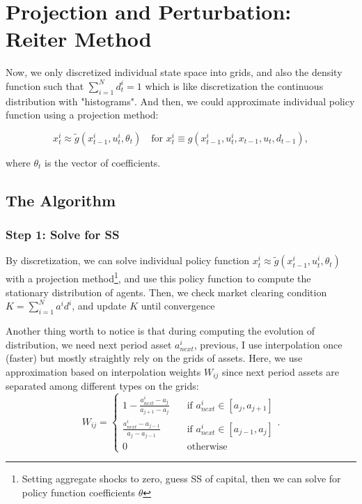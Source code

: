 \section{Projection and Perturbation: Reiter Method}

Now, we only {\color{red} discretized individual state space into grids}, and also the density function such that $\sum_{i=1}^{N} d^i_t = 1$ which is like discretization the continuous distribution with "histograms". And then, we could approximate individual policy function using a projection method:

\[ 
x^i_t \approx \tilde{g}(x^i_{t-1},u^i_t, \theta_t) \quad \text{for } x^i_t \equiv g(x^i_{t-1}, u^i_t, x_{t-1},u_t,d_{t-1}), 
\]

where $\theta_t$ is the vector of coefficients. 

\subsection{The Algorithm}

\subsubsection*{Step 1: Solve for SS}

By discretization, we can solve individual policy function $x^i_t \approx \tilde{g}(x^i_{t-1},u^i_t, \theta_t)$ with a projection method\footnote{Setting aggregate shocks to zero, guess SS of capital, then we can solve for policy function coefficients $\theta$}, and use this policy function to compute the stationary distribution of agents. Then, we check market clearing condition $K=\sum_{i=1}^{N} a^i d^i$, and update $K$ until convergence

Another thing worth to notice is that during computing the evolution of distribution, we need next period asset $a^i_{next}$, previous, I use interpolation once (faster) but mostly straightly rely on the grids of assets. Here, we use approximation based on interpolation weights $W_{ij}$ since next period assets are separated among different types on the grids: 
\[
 W_{ij}=
 \begin{cases}
 1- \frac{a^i_{next} - a_j}{a_{j+1}-a_j} \quad &\text{if } a^i_{next} \in [a_j, a_{j+1}]\\ 
 \frac{a^i_{next} - a_{j-1}}{a_{j}-a_{j-1}} \quad &\text{if } a^i_{next} \in [a_{j-1}, a_{j}] \\
 0  \quad &\text{otherwise } 
 \end{cases}. 
\]

